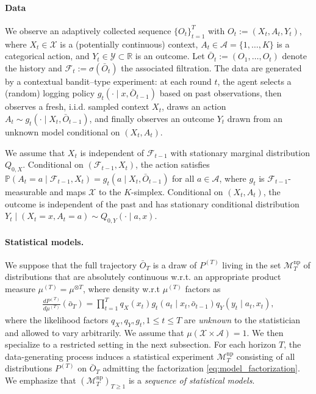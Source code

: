 \documentclass[11pt]{article}
\begin{document}
\paragraph{Data} We observe an adaptively collected sequence $\{O_t\}_{t=1}^T$ with $O_t := (X_t,A_t,Y_t)$, where $X_t\in\mathcal X$ is a (potentially continuous) context, $A_t\in\mathcal A=\{1,\dots,K\}$ is a categorical action, and $Y_t\in\mathcal Y\subset\mathbb R$ is an outcome. Let $\bar O_t := (O_1,\dots,O_t)$ denote the history and $\mathcal F_t := \sigma(\bar O_t)$ the associated filtration. The data are generated by a contextual bandit--type experiment: at each round $t$, the agent selects a (random) logging policy $g_t(\cdot\mid x, \bar{O}_{t-1})$ based on past observations, then observes a fresh, i.i.d. sampled context $X_t$, draws an action $A_t\sim g_t(\cdot\mid X_t, \bar{O}_{t-1})$, and finally observes an outcome $Y_t$ drawn from an unknown model conditional on $(X_t,A_t)$.

 We assume that $X_t$ is independent of $\mathcal F_{t-1}$ with stationary marginal distribution $Q_{0,X}$. Conditional on $(\mathcal F_{t-1},X_t)$, the action satisfies $\mathbb P(A_t=a\mid \mathcal F_{t-1},X_t)=g_t(a\mid X_t, \bar{O}_{t-1})$ for all $a\in\mathcal A$, where $g_t$ is $\mathcal F_{t-1}$-measurable and maps $\mathcal X$ to the $K$-simplex. Conditional on $(X_t,A_t)$, the outcome is independent of the past and has stationary conditional distribution $Y_t \mid (X_t=x,A_t=a)\sim Q_{0,Y}(\cdot\mid a,x)$. 

\paragraph{Statistical models.} We suppose that the full trajectory $\bar{O}_T$ is a draw of $P^{(T)}$ living in the set $\mathcal{M}_T^{\mathrm{np}}$ of distributions that are absolutely continuous w.r.t. an appropriate product measure $\mu^{(T)} = \mu^{\otimes T}$, where density w.r.t $\mu^{(T)}$ factors as 
\begin{align}
    \frac{dP^{(T)}}{d \mu^{(T)}}(\bar{o}_T) = \prod_{t=1}^{T}q_X(x_t)g_t(a_t\mid x_t, \bar{o}_{t-1})q_{Y}(y_t\mid a_t, x_t),
    \label{eq:model_factorization}
\end{align}
where the likelihood factors $q_X, q_Y, g_t, 1\leq t\leq T$ are \emph{unknown} to the statistician and allowed to vary arbitrarily. We assume that $\mu(\mathcal{X}\times \mathcal{A}) = 1$. We then specialize to a restricted setting in the next subsection.  For each horizon $T$, the data-generating process induces a statistical experiment
$\mathcal M_T^{\mathrm{np}}$ consisting of all distributions $P^{(T)}$ on $\bar O_T$
admitting the factorization \eqref{eq:model_factorization}.
We emphasize that $(\mathcal M_T^{\mathrm{np}})_{T\ge 1}$ is a \emph{sequence of statistical models}. 
\end{document}
